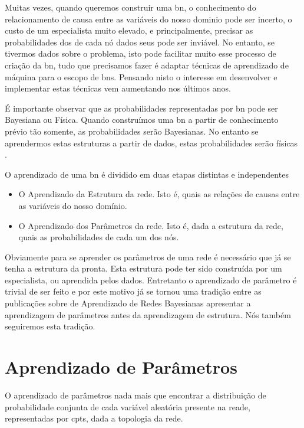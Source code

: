 \label{ch:aprendizado}
Muitas vezes, quando queremos construir uma \gls{bn}, o conhecimento do relacionamento de causa entre as variáveis do nosso dominio pode ser incerto, o custo de um especialista muito elevado, e principalmente, precisar as probabilidades dos de cada nó dados seus pode ser inviável. No entanto, se tivermos dados sobre o problema, isto pode facilitar muito esse processo de criação da \gls{bn}, tudo que precisamos fazer é adaptar técnicas de aprendizado de máquina para o escopo de \glspl{bn}. Pensando nisto o interesse em desenvolver e implementar estas técnicas vem aumentando nos últimos anos.

É importante observar que as probabilidades representadas por \gls{bn} pode ser Bayesiana ou Física. Quando construímos uma \gls{bn} a partir de conhecimento prévio tão somente, as probabilidades serão Bayesianas. No entanto se aprendermos estas estruturas a partir de dados, estas probabilidades serão físicas \cite{heck95}.

O aprendizado de uma \gls{bn} é dividido em duas etapas distintas e independentes
\begin{itemize}
	\item O Aprendizado da Estrutura da rede. Isto é, quais as relações de causas entre as variáveis do nosso domínio.
	\item O Aprendizado dos Parâmetros da rede. Isto é, dada a estrutura da rede, quais as probabilidades de cada um dos nós.
\end{itemize}

Obviamente para se aprender os parâmetros de uma rede é necessário que já se tenha a estrutura da pronta. Esta estrutura pode ter sido construída por um especialista, ou aprendida pelos dados. Entretanto o aprendizado de parâmetro é trivial de ser feito e por este motivo já se tornou uma tradição entre as publicações sobre de Aprendizado de Redes Bayesianas apresentar a aprendizagem de parâmetros antes da aprendizagem de estrutura. Nós também seguiremos esta tradição.

\section{Aprendizado de Parâmetros}
O aprendizado de parâmetros nada mais que encontrar a distribuição de probabilidade conjunta de cada variável aleatória presente na reade, representadas por \glspl{cpt}, dada a topologia da rede.

